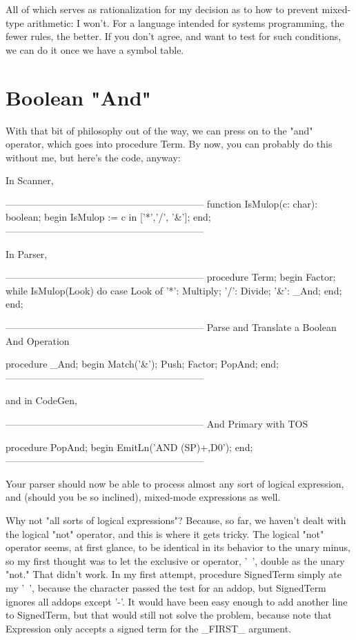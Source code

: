 \documentclass[float=false, crop=false]{standalone}
\begin{document}
All of which serves as rationalization for my decision as to how to prevent
mixed-type arithmetic: I won't. For a language intended for systems programming,
the fewer rules, the better. If you don't agree, and want to test for such
conditions, we can do it once we have a symbol table.

\section{Boolean "And"}

With that bit of philosophy out of the way, we can press on to the "and"
operator, which goes into procedure Term. By now, you can probably do this
without me, but here's the code, anyway:

In Scanner,

\begin{code}
{--------------------------------------------------------------}
function IsMulop(c: char): boolean;
begin
	IsMulop := c in ['*','/', '&'];
end;
{--------------------------------------------------------------}
\end{code}

In Parser,

\begin{code}
{--------------------------------------------------------------}
procedure Term;
begin
	Factor;
	while IsMulop(Look) do
		case Look of
			'*': Multiply;
			'/': Divide;
			'\&': _And;
		end;
end;

{--------------------------------------------------------------}
{ Parse and Translate a Boolean And Operation }

procedure _And;
begin
	Match('\&');
	Push;
	Factor;
	PopAnd;
end;
{--------------------------------------------------------------}
\end{code}

and in CodeGen,

\begin{code}
{--------------------------------------------------------------}
{ And Primary with TOS }

procedure PopAnd;
begin
	EmitLn('AND (SP)+,D0');
end;
{--------------------------------------------------------------}
\end{code}

Your parser should now be able to process almost any sort of logical expression,
and (should you be so inclined), mixed-mode expressions as well.

Why not "all sorts of logical expressions"? Because, so far, we haven't dealt
with the logical "not" operator, and this is where it gets tricky. The logical
"not" operator seems, at first glance, to be identical in its behavior to the
unary minus, so my first thought was to let the exclusive or operator, '~',
double as the unary "not." That didn't work. In my first attempt, procedure
SignedTerm simply ate my '~', because the character passed the test for an
addop, but SignedTerm ignores all addops except '-'. It would have been easy
enough to add another line to SignedTerm, but that would still not solve the
problem, because note that Expression only accepts a signed term for the _FIRST_
argument.
\end{document}
